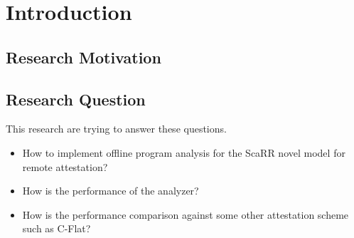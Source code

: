 
\chapter{Introduction} %

\label{Chapter1} %


\section{Research Motivation}

\section{Research Question}

This research are trying to answer these questions.
\begin{itemize}
    \item How to implement offline program analysis for the ScaRR novel model for remote attestation?
    \item How is the performance of the analyzer?
    \item How is the performance comparison against some other attestation scheme such as C-Flat?
\end{itemize}